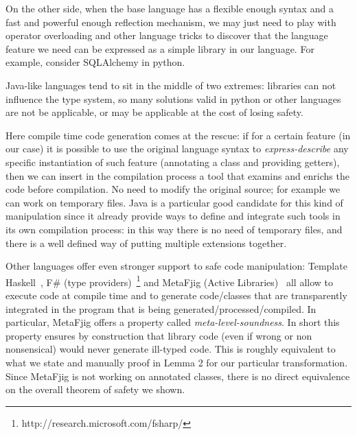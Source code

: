 On the other side, when the base language has a flexible enough syntax and
a fast and powerful enough reflection mechanism, we may just need to play with
operator overloading and other language tricks to discover that the language
feature we need can be expressed as a simple library in our language. For
example, consider SQLAlchemy in python.

Java-like languages tend to sit in the middle of two extremes: libraries
can not influence the type system, so many solutions valid in python or other
languages are not be applicable, or may be applicable at the cost of losing
safety.

Here compile time code generation comes at the rescue: if for a certain feature
(\mixin in our case) it is possible to use the original language syntax to
\emph{express-describe} any specific instantiation of such feature (annotating a
class and providing getters), then we can insert in the compilation process a tool
that examins and enrichs the code before compilation. No need to modify the
original source; for example we can work on temporary files. Java is a particular
good candidate for this kind of manipulation since it already provide ways to
define and integrate such tools in its own compilation process: in this way
there is no need of temporary files, and there is a well defined way of putting
multiple extensions together.

Other languages offer even stronger support to safe code manipulation:
Template Haskell~\cite{sheard2002template}, F\# (type providers)~\footnote{http://research.microsoft.com/fsharp/} and MetaFjig (Active Libraries)~\cite{servetto2010metafjig}
all allow to execute code at compile time and to generate code/classes that are transparently integrated in the program that is being generated/processed/compiled.
In particular, MetaFjig offers a property called \emph{meta-level-soundness}. In short this property ensures by construction that library code (even if wrong or non nonsensical) would never generate ill-typed code. This is roughly equivalent to what we state and manually proof in Lemma 2 for our particular transformation.
Since MetaFjig is not working on annotated classes, there is no direct equivalence on the overall theorem of safety we shown.

